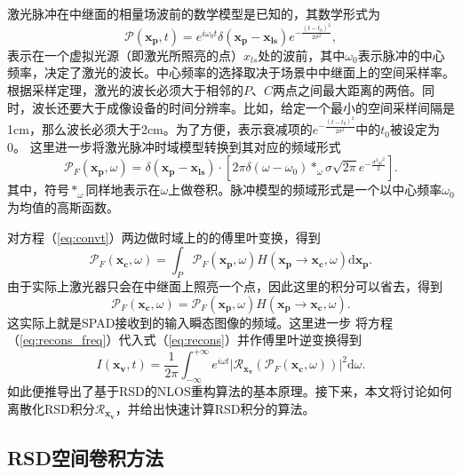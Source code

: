 \documentclass[master]{shtthesis}             %
\begin{document}
激光脉冲在中继面的相量场波前的数学模型是已知的，其数学形式为
\begin{equation}\label{eq:impul}
 \mathcal{P}(\mathbf{x_p},t) = e^{i\omega_0 t}\delta(\mathbf{x_p}-\mathbf{x_{ls}})e^{-\frac{(t-t_0)^2}{2\sigma^2}},
\end{equation}
表示在一个虚拟光源（即激光所照亮的点）$x_{ls}$处的波前，其中$\omega_0$表示脉冲的中心频率，决定了激光的波长。中心频率的选择取决于场景中中继面上的空间采样率。根据采样定理，激光的波长必须大于相邻的$P$、$C$两点之间最大距离的两倍。同时，波长还要大于成像设备的时间分辨率\citep{Liu2019}。比如，给定一个最小的空间采样间隔是1cm，那么波长必须大于2cm。为了方便，表示衰减项的$e^{-\frac{(t-t_0)^2}{2\sigma^2}}$中的$t_0$被设定为0。
这里进一步将激光脉冲时域模型转换到其对应的频域形式
\begin{equation} \label{eq:impul_freq}
 \mathcal{P}_F(\mathbf{x_p},\omega) = \delta(\mathbf{x_p}-\mathbf{x_{ls}})\cdot \left[ 2\pi\delta(\omega-\omega_0)*_\omega\sigma\sqrt{2\pi}e^{-\frac{\sigma^2\omega^2}{2}} \right].
\end{equation}
其中，符号$*_\omega$同样地表示在$\omega$上做卷积。脉冲模型的频域形式是一个以中心频率$\omega_0$为均值的高斯函数。

对方程（\ref{eq:convt}）两边做时域上的的傅里叶变换，得到
\begin{equation}
  \mathcal{P}_F(\mathbf{x_c},\omega) = \int_P \mathcal{P}_F(\mathbf{x_p},\omega) H(\mathbf{x_p}\rightarrow \mathbf{x_c},\omega) \text{d}\mathbf{x_p}.
\end{equation}
由于实际上激光器只会在中继面上照亮一个点，因此这里的积分可以省去，得到
\begin{equation}\label{eq:input_trans}
  \mathcal{P}_F(\mathbf{x_c},\omega) = \mathcal{P}_F(\mathbf{x_p},\omega) H(\mathbf{x_p}\rightarrow \mathbf{x_c},\omega).
\end{equation}
这实际上就是SPAD接收到的输入瞬态图像的频域。这里进一步
将方程（\ref{eq:recons_freq}）代入式（\ref{eq:recons}）并作傅里叶逆变换得到
\begin{equation}\label{eq:rsd_recons_pp}
  I(\mathbf{x_v},t)=\frac{1}{2\pi}\int_{-\infty}^{+\infty}e^{i\omega t}\Big| \mathcal{R}_{\mathbf{x_v}} \left( \mathcal{P}_F(\mathbf{x_c},\omega) \right) \Big|^2 \text{d}\omega.
\end{equation}
如此便推导出了基于RSD的NLOS重构算法的基本原理。接下来，本文将讨论如何离散化RSD积分$\mathcal{R}_{\mathbf{x_v}}$，并给出快速计算RSD积分的算法。

\subsection{RSD空间卷积方法}\label{sec:rsd_space_conv}
\end{document}
